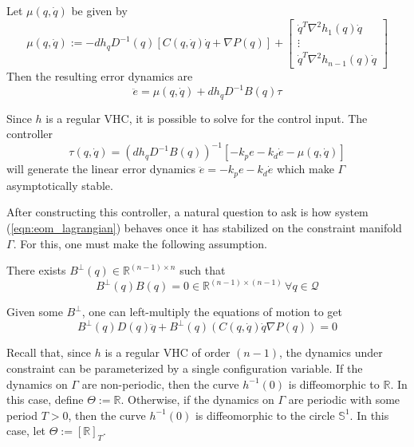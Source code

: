 Let \(\mu(q,\dot{q})\) be given by 
\begin{equation*}
   \mu(q,\dot{q}) := -dh_qD^{-1}(q)\left[C(q,\dot{q})\dot{q} + \nabla P(q) \right] 
      + \begin{bmatrix}
         \dot{q}^T \nabla^2 h_1(q) \dot{q} \\
         \vdots \\
         \dot{q}^T \nabla^2 h_{n-1}(q) \dot{q}
      \end{bmatrix}
\end{equation*}
Then the resulting error dynamics are
\begin{equation}\label{eqn:vhc_error_dynamics}
   \ddot{e} = \mu(q,\dot{q}) + dh_q D^{-1}B(q) \tau
\end{equation}

Since \(h\) is a regular VHC, it is possible to solve for the control input. 
The controller
\begin{equation*}
   \tau(q,\dot{q}) = \left(dh_q D^{-1}B(q)\right)^{-1}\left[-k_p e - k_d \dot{e} -
   \mu(q,\dot{q})\right]
\end{equation*}
will generate the linear error dynamics \(\ddot{e} = -k_p e - k_d\dot{e}\) 
which make \(\Gamma\) asymptotically stable.

After constructing this controller, a natural question to ask is how system
(\ref{eqn:eom_lagrangian}) behaves once it has stabilized on the constraint
manifold \(\Gamma\). For this, one must make the following assumption.

\begin{assm}\label{assm:B_perp_exists}
   There exists \(B^\perp(q) \in \mathbb{R}^{(n-1) \times n}\) such that
   \[
      B^\perp(q) B(q) = 0 \in \mathbb{R}^{(n-1)\times(n-1)} \, \forall q \in
   \mathcal{Q}
   \]
\end{assm}

Given some \(B^\perp\), one can left-multiply the equations of motion to get
\begin{equation}\label{eqn:eom_lagrangian_with_B_perp}
   B^\perp(q)D(q)\ddot{q} + B^\perp(q)\left(C(q,\dot{q})\dot{q} \nabla
   P(q)\right) = 0
\end{equation}

Recall that, since \(h\) is a regular VHC of order \((n-1)\), the dynamics under
constraint can be parameterized by a single configuration variable.  If the
dynamics on \(\Gamma\) are non-periodic, then the curve \(h^{-1}(0)\) is
diffeomorphic to \(\mathbb{R}\). In this case, define \(\Theta := \mathbb{R}\).
Otherwise, if the dynamics on \(\Gamma\) are periodic with some period \(T > 0\), 
then the curve \(h^{-1}(0)\) is diffeomorphic to the circle
\(\mathbb{S}^1\). In this case, let \(\Theta := [\mathbb{R}]_T\).

